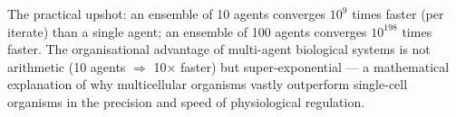 The practical upshot: an ensemble of 10 agents converges $10^9$ times faster
(per iterate) than a single agent; an ensemble of 100 agents converges
$10^{198}$ times faster.  The organisational advantage of multi-agent
biological systems is not arithmetic (10 agents $\Rightarrow$ 10$\times$
faster) but super-exponential — a mathematical explanation of why multicellular
organisms vastly outperform single-cell organisms in the precision and speed
of physiological regulation.
